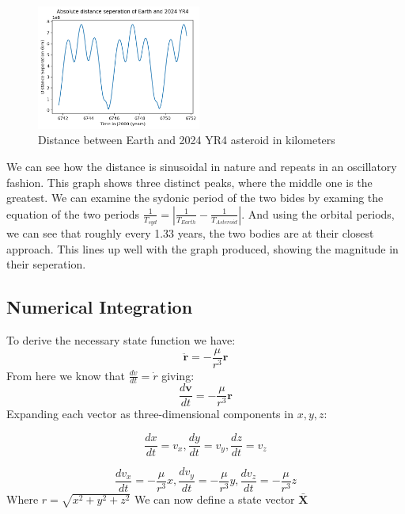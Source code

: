 \documentclass[12pt,twocolumn]{article}  %
\begin{document}
\begin{figure}[H]
    \centering
    \includegraphics[width=0.48\textwidth]{Images/115-dis.png}
    \caption{Distance between Earth and 2024 YR4 asteroid in kilometers}
\end{figure}

\noindent We can see how the distance is sinusoidal in nature and repeats in an oscillatory fashion. 
This graph shows three distinct peaks, where the middle one is the greatest. We can examine the sydonic period of 
the two bides by examing the equation of the two periods $\frac{1}{T_{syd}} = |\frac{1}{T_{Earth}} - \frac{1}{T_{Asteroid}}|$. And using the orbital periods,
we can see that roughly every 1.33 years, the two bodies are at their closest approach. This lines up well with the graph produced,
showing the magnitude in their seperation. 


\subsection{Numerical Integration}
To derive the necessary state function we have:
\setcounter{equation}{0}
\begin{equation}
    \ddot{\mathbf{r}} = -\frac{\mu}{r^3} \mathbf{r}
\end{equation}
From here we know that $\frac{dv}{dt} = \dot{r}$ giving:
\begin{equation}
    \frac{d\mathbf{v}}{dt} = -\frac{\mu}{r^3} \mathbf{r}
\end{equation}
Expanding each vector as three-dimensional components in $x,y,z$:

\begin{equation}
    \frac{dx}{dt} = v_{x},  \frac{dy}{dt} = v_{y},   \frac{dz}{dt} = v_{z}
\end{equation}


\begin{equation}
    \frac{dv_{x}}{dt} = -\frac{\mu}{r^3} x, \frac{dv_{y}}{dt} = -\frac{\mu}{r^3} y, \frac{dv_{z}}{dt} = -\frac{\mu}{r^3} z
\end{equation}
Where $r = \sqrt{x^{2} + y^{2} + z^{2}}$
\newline
We can now define a state vector $\mathbf{\bar{X}}$
\end{document}
